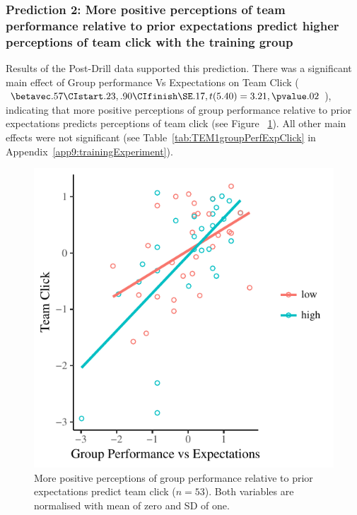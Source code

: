 \subsubsection{Prediction 2: More positive perceptions of team performance relative to prior expectations predict higher perceptions of team click with the training group}

Results of the Post-Drill data supported this prediction. There was a significant main effect of Group performance Vs Expectations on Team Click ($\betavec .57 \CIstart .23, .90 \CIfinish \SE .17, t(5.40) = 3.21, \pvalue .02$), indicating that more positive perceptions of group performance relative to prior expectations predicts perceptions of team click (see Figure ~\ref{fig:teamPerfExpClickScatter}).  All other main effects were not significant (see Table~\ref{tab:TEM1groupPerfExpClick} in Appendix~\ref{app9:trainingExperiment}).


\begin{figure}
    \centering
    \includegraphics[width=0.5\linewidth,keepaspectratio] {images/teamPerfExpClickScatter-1}
    \caption{More positive perceptions of group performance relative to prior expectations predict team click ($n = 53$).  Both  variables are normalised with mean of zero and SD of one.}
    \label{fig:teamPerfExpClickScatter}
\end{figure}


